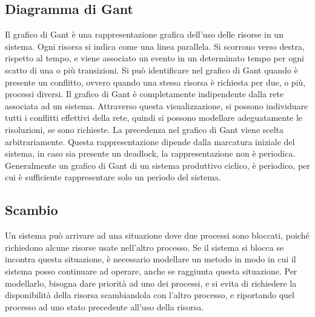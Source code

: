 \documentclass{article}
\numberwithin{equation}{subsection}
\begin{document}
\subsection{Diagramma di Gant}

Il grafico di Gant è una rappresentazione grafica dell'uso delle risorse in un sistema. Ogni risorsa si indica come una linea parallela. Si scorrono verso destra, rispetto 
al tempo, e viene associato un evento in un determinato tempo per ogni scatto di una o più transizioni. Si può identificare nel grafico di Gant quando è presente un conflitto, 
ovvero quando una stessa risorsa è richiesta per due, o più, processi diversi. Il grafico di Gant è completamente indipendente dalla rete associata ad un sistema. Attraverso 
questa visualizzazione, si possono individuare tutti i conflitti effettivi della rete, quindi si possono modellare adeguatamente le risoluzioni, se sono richieste. La 
precedenza nel grafico di Gant viene scelta arbitrariamente. Questa 
rappresentazione dipende dalla marcatura iniziale del sistema, in caso sia presente un deadlock, la rappresentazione non è periodica. Generalmente un grafico di Gant di un 
sistema produttivo ciclico, è periodico, per cui è sufficiente rappresentare solo un periodo del sistema. 

\subsection{Scambio}

Un sistema può arrivare ad una situazione dove due processi sono bloccati, poiché richiedono alcune risorse usate nell'altro processo. Se il sistema si blocca se incontra 
questa situazione, è necessario modellare un metodo in modo in cui il sistema posso continuare ad operare, anche se raggiunta questa situazione. Per modellarlo, bisogna 
dare priorità ad uno dei processi, e si evita di richiedere la disponibilità della risorsa scambiandola con l'altro processo, e riportando quel processo ad uno stato 
precedente all'uso della risorsa. 
\end{document}
